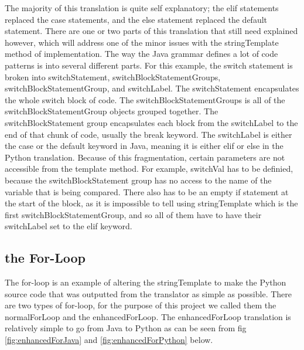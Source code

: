 \documentclass{l4proj}
\begin{document}
The majority of this translation is quite self explanatory; the elif statements replaced the case statements, and the else statement replaced the default statement. There are one or two parts of this translation that still need explained however, which will address one of the minor issues with the stringTemplate method of implementation.
The way the Java grammar defines a lot of code patterns is into several different parts. For this example, the switch statement is broken into switchStatement, switchBlockStatementGroups, switchBlockStatementGroup, and switchLabel. The switchStatement encapsulates the whole switch block of code. The switchBlockStatementGroups is all of the switchBlockStatementGroup objects grouped together. The switchBlockStatement group encapsulates each block from the switchLabel to the end of that chunk of code, usually the break keyword. The switchLabel is either the case or the default keyword in Java, meaning it is either elif or else in the Python translation. 
Because of this fragmentation, certain parameters are not accessible from the template method. For example, switchVal has to be definied, because the switchBlockStatement group has no access to the name of the variable that is being compared. There also has to be an empty if statement at the start of the block, as it is impossible to tell using stringTemplate which is the first switchBlockStatementGroup, and so all of them have to have their switchLabel set to the elif keyword.

\subsection{the For-Loop}
The for-loop is an example of altering the stringTemplate to make the Python source code that was outputted from the translator as simple as possible. There are two types of for-loop, for the purpose of this project we called them the normalForLoop and the enhancedForLoop. 
The enhancedForLoop translation is relatively simple to go from Java to Python as can be seen from fig \ref{fig:enhancedForJava} and \ref{fig:enhancedForPython} below.
\end{document}
